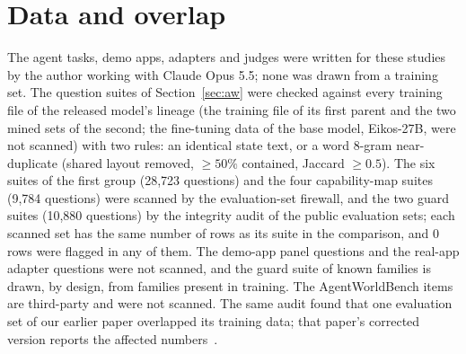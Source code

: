 \documentclass[11pt]{article}
\begin{document}
\section{Data and overlap}\label{sec:overlap}
The agent tasks, demo apps, adapters and judges were written for these studies by the author working with Claude Opus
5.5; none was drawn from a training set. The question suites of Section~\ref{sec:aw} were checked against every training
file of the released model's lineage (the training file of its first parent and the two mined sets of the second; the fine-tuning data of the base model, Eikos-27B, were
not scanned) with two rules: an identical state text, or a word 8-gram near-duplicate (shared layout removed, $\ge 50\%$ contained, Jaccard
$\ge 0.5$). The six suites of the first group (28,723 questions) and the four capability-map suites (9,784 questions) were
scanned by the evaluation-set firewall, and the two guard suites (10,880 questions) by the integrity audit of the public
evaluation sets; each scanned set has the same number of rows as its suite in the comparison, and 0 rows were flagged in
any of them. The demo-app panel questions and the real-app adapter questions were not scanned, and the guard suite of
known families is drawn, by design, from families present in training. The AgentWorldBench items are third-party and
were not scanned. The same audit found that one evaluation set of our earlier paper overlapped its training data; that
paper's corrected version reports the affected numbers~\cite{vicentino2026ekbasisv2}.
\end{document}
